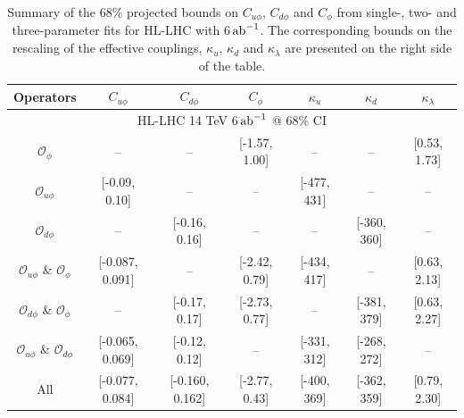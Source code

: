 \begin{table}[]
	\centering
	{\footnotesize
		\begin{tabular}{cccc||ccc}
			\toprule
			Operators &  $C_{u\phi}$&   $C_{d\phi}$&   $C_{\phi}$&    $\kappa_{u}$&   $\kappa_{d}$&   $\kappa_\lambda$\\
			\midrule
			\multicolumn{7}{c}{HL-LHC 14 TeV 6$\,{\rm ab}^{-1}$ @ 68\% CI}\\
			\midrule
			$\mathcal O_{\phi}$ &--   & --            &[-1.57, 1.00] &--  & -- &[0.53, 1.73]\\
			$\mathcal O_{u\phi}$&[-0.09, 0.10]   & --            &-- &[-477, 431]  & -- &--\\
			$\mathcal O_{d\phi}$&--   & [-0.16, 0.16]            &-- &--  & [-360, 360] &--\\
			$\mathcal O_{u\phi}$ \& $\mathcal O_{\phi}$ &[-0.087, 0.091]  & --            &[-2.42, 0.79] &[-434, 417] & -- &[0.63, 2.13]\\
			$\mathcal O_{d\phi}$ \& $\mathcal O_{\phi}$ & --             &[-0.17, 0.17]  &[-2.73, 0.77]& -- &[-381, 379] &[0.63, 2.27]\\
			$\mathcal O_{u\phi}$ \& $\mathcal O_{d\phi}$&[-0.065, 0.069]&[-0.12, 0.12]& --            &[-331, 312] &[-268, 272] & -- \\
			All                                   &[-0.077, 0.084]&[-0.160, 0.162]& [-2.77, 0.43]&[-400, 369] &[-362, 359] & [0.79, 2.30] \\
			\bottomrule
		\end{tabular}
	}
	\caption{Summary of the 68\% projected bounds on $C_{u\phi}$, $C_{d\phi}$ and $C_\phi$ from single-, two- and three-parameter fits for HL-LHC with 6$\,{\rm ab}^{-1}$. The corresponding bounds on the rescaling of the effective couplings, $\kappa_u$, $\kappa_d$ and $\kappa_\lambda$ are presented on the right side of the table.}
	\label{tab:twoparambounds}
\end{table}
